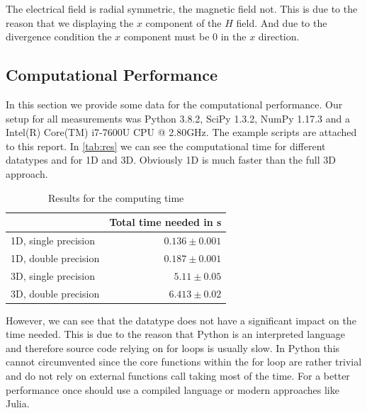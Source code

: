 \documentclass[a4paper,12pt]{scrartcl}
\begin{document}
    The electrical field is radial symmetric, the magnetic field not.
    This is due to the reason that we displaying the $x$ component of the $H$ field. And due to the divergence condition the $x$ component 
    must be 0 in the $x$ direction.
    
    
    \subsection{Computational Performance}
        In this section we provide some data for the computational performance.
        Our setup for all measurements was Python 3.8.2, SciPy 1.3.2, NumPy 1.17.3 and a Intel(R) Core(TM) i7-7600U CPU @ 2.80GHz.
        The example scripts are attached to this report.
        In \autoref{tab:res} we can see the computational time
        for different datatypes and for 1D and 3D. Obviously 1D is much faster than the full 3D approach.
        \begin{table}[h]
            \centering
            \begin{tabular}{l r}
               &  Total time needed in \si{\second}  \\
               \hline
                1D, single precision &  $0.136\pm 0.001$ \\
                1D, double precision &  $0.187\pm 0.001$ \\
                \hline
                3D, single precision &  $5.11\pm 0.05$ \\
                3D, double precision &  $6.413\pm 0.02$  \\
            \end{tabular}
            \caption{Results for the computing time}
            \label{tab:res}
        \end{table}
        However, we can see that the datatype does not have a significant
        impact on the time needed. This is due to the reason that Python is an interpreted language and therefore source code relying on for loops is usually slow. In Python this cannot circumvented since the core functions within the for loop are rather trivial and do not rely on external functions call taking most of the time.
        For a better performance once should use a compiled language or modern approaches like Julia.
        
\end{document}
